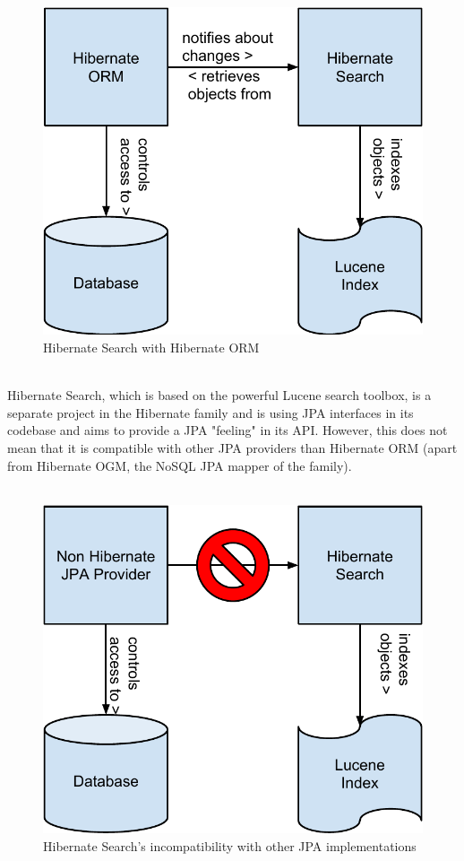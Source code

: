 \begin{figure}[ht]
	\centering
	\includegraphics[scale=0.5]{images/hibernate_search_hibernate_schema.pdf}
	\caption{Hibernate Search with Hibernate ORM}
	\label{fig1}
\end{figure}
\\
Hibernate Search, which is based on the powerful Lucene search toolbox, is a separate project in the Hibernate family and is using JPA interfaces in its codebase and aims to provide a JPA "feeling" in its API. However, this does not mean that it is compatible with other JPA providers than Hibernate ORM (apart from Hibernate OGM, the NoSQL JPA mapper of the family).
\\\\
\begin{figure}[ht]
	\centering
	\includegraphics[scale=0.5]{images/hibernate_search_any_jpa_problem_schema.pdf}
	\caption{Hibernate Search's incompatibility with other JPA implementations}
	\label{fig2}
\end{figure}
